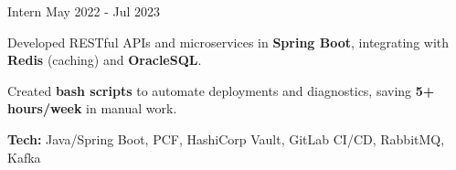 \begin{cventries}
  \cventry
    {Intern} %
    {} %
    {} %
    {May 2022 - Jul 2023} %
    {
      \begin{cvitems} %
        \item {Developed RESTful APIs and microservices in \textbf{Spring Boot}, integrating with \textbf{Redis} (caching) and \textbf{OracleSQL}.}
        \item {Created \textbf{bash scripts} to automate deployments and diagnostics, saving \textbf{5+ hours/week} in manual work.}
        \item {\textbf{Tech:} Java/Spring Boot, PCF, HashiCorp Vault, GitLab CI/CD, RabbitMQ, Kafka}
      \end{cvitems}
    }
\end{cventries}